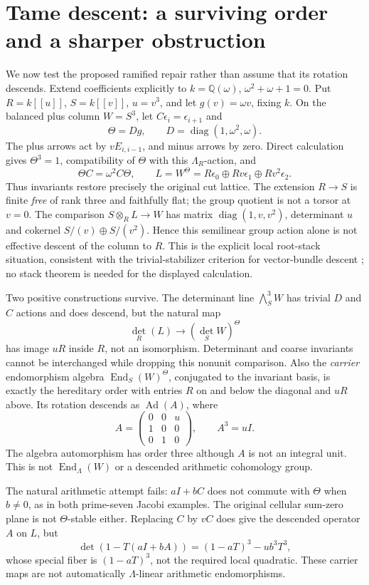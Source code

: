 \section{Tame descent: a surviving order and a sharper obstruction}
We now test the proposed ramified repair rather than assume that its rotation descends. Extend coefficients explicitly to $k=\mathbb Q(\omega)$, $\omega^2+\omega+1=0$. Put $R=k[[u]]$, $S=k[[v]]$, $u=v^3$, and let $g(v)=\omega v$, fixing $k$. On the balanced plus column $W=S^3$, let $C\epsilon_i=\epsilon_{i+1}$ and
\[
 \Theta=Dg,\qquad D=\operatorname{diag}(1,\omega^2,\omega).
\]
The plus arrows act by $vE_{i,i-1}$, and minus arrows by zero. Direct calculation gives $\Theta^3=1$, compatibility of $\Theta$ with this $\Lambda_R$-action, and
\[
 \Theta C=\omega^2C\Theta,\qquad
 L=W^\Theta=R\epsilon_0\oplus Rv\epsilon_1\oplus Rv^2\epsilon_2.
\]
Thus invariants restore precisely the original cut lattice. The extension $R\to S$ is finite \emph{free} of rank three and faithfully flat; the group quotient is not a torsor at $v=0$. The comparison $S\otimes_R L\to W$ has matrix $\operatorname{diag}(1,v,v^2)$, determinant $u$ and cokernel $S/(v)\oplus S/(v^2)$. Hence this semilinear group action alone is not effective descent of the column to $R$. This is the explicit local root-stack situation, consistent with the trivial-stabilizer criterion for vector-bundle descent \cite[Theorem10.3]{AlperDescent}; no stack theorem is needed for the displayed calculation.

Two positive constructions survive. The determinant line $\bigwedge_S^3W$ has trivial $D$ and $C$ actions and does descend, but the natural map
\[
 \det_R(L)\longrightarrow(\det_S W)^\Theta
\]
has image $uR$ inside $R$, not an isomorphism. Determinant and coarse invariants cannot be interchanged while dropping this nonunit comparison. Also the \emph{carrier} endomorphism algebra $\operatorname{End}_S(W)^\Theta$, conjugated to the invariant basis, is exactly the hereditary order with entries $R$ on and below the diagonal and $uR$ above. Its rotation descends as $\operatorname{Ad}(A)$, where
\[
 A=\begin{pmatrix}0&0&u\\1&0&0\\0&1&0\end{pmatrix},\qquad A^3=uI.
\]
The algebra automorphism has order three although $A$ is not an integral unit. This is not $\operatorname{End}_\Lambda(W)$ or a descended arithmetic cohomology group.

The natural arithmetic attempt fails: $aI+bC$ does not commute with $\Theta$ when $b\ne0$, as in both prime-seven Jacobi examples. The original cellular sum-zero plane is not $\Theta$-stable either. Replacing $C$ by $vC$ does give the descended operator $A$ on $L$, but
\[
 \det(1-T(aI+bA))=(1-aT)^3-ub^3T^3,
\]
whose special fiber is $(1-aT)^3$, not the required local quadratic. These carrier maps are not automatically $\Lambda$-linear arithmetic endomorphisms.

